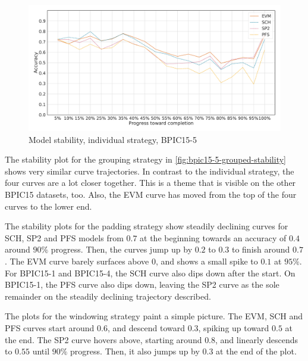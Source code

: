 \begin{figure}[!htb]
    \centering
    \includegraphics[width=\textwidth]{gfx/bpic2015_5/individual_stability.pdf}
    \caption{Model stability, individual strategy, BPIC15-5}
    \label{fig:bpic15-5-individual-stability}
\end{figure}

The stability plot for the grouping strategy in \autoref{fig:bpic15-5-grouped-stability} shows very similar curve trajectories.
In contrast to the individual strategy, the four curves are a lot closer together.
This is a theme that is visible on the other BPIC15 datasets, too.
Also, the EVM curve has moved from the top of the four curves to the lower end.

The stability plots for the padding strategy show steadily declining curves for SCH, SP2 and PFS models from $0.7$ at the beginning towards an accuracy of $0.4$ around $90\%$ progress.
Then, the curves jump up by $0.2$ to $0.3$ to finish around $0.7$.
The EVM curve barely surfaces above $0$, and shows a small spike to $0.1$ at $95\%$.
For BPIC15-1 and BPIC15-4, the SCH curve also dips down after the start.
On BPIC15-1, the PFS curve also dips down, leaving the SP2 curve as the sole remainder on the steadily declining trajectory described.

The plots for the windowing strategy paint a simple picture.
The EVM, SCH and PFS curves start around $0.6$, and descend toward $0.3$, spiking up toward $0.5$ at the end.
The SP2 curve hovers above, starting around $0.8$, and linearly descends to $0.55$ until $90\%$ progress.
Then, it also jumps up by $0.3$ at the end of the plot.

